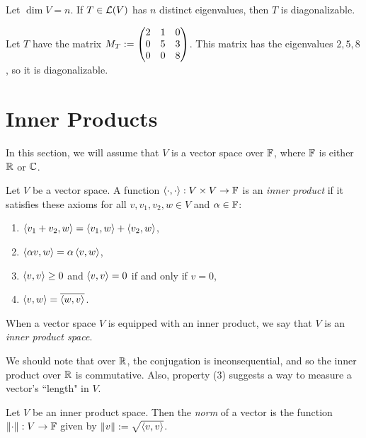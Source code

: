 \documentclass{article}
\begin{document}
\begin{corollary}
Let $\dim V = n$. If $T\in\mathcal L(V)$ has $n$ distinct eigenvalues, then $T$ is diagonalizable.
\end{corollary}
\begin{example}
Let $T$ have the matrix $M_T :=\begin{pmatrix}2 & 1 & 0 \\ 0 & 5 & 3 \\ 0 & 0 & 8 \end{pmatrix}$. This matrix has the eigenvalues $2, 5, 8$, so it is diagonalizable.
\end{example}
\section{Inner Products}
In this section, we will assume that $V$ is a vector space over $\mathbb F$, where $\mathbb F$ is either $\mathbb R$ or $\mathbb C$.
\begin{definition}
Let $V$ be a vector space. A function $\left\langle\cdot, \cdot\right\rangle: V\times V\to \mathbb F$ is an \textit{inner product} if it satisfies these axioms for all $v, v_1, v_2, w\in V$ and $\alpha\in\mathbb F$:
\begin{enumerate}
    \item $\left\langle v_1+v_2, w\right\rangle = \left\langle v_1, w\right\rangle + \left\langle v_2, w\right\rangle$,
    \item $\left\langle\alpha v, w\right\rangle = \alpha\left\langle v, w\right\rangle$,
    \item $\left\langle v, v\right\rangle\geq 0$ and $\left\langle v,v\right\rangle = 0$ if and only if $v=0$,
    \item $\left\langle v, w\right\rangle = \overline{\left\langle w, v\right\rangle}$.
\end{enumerate}
When a vector space $V$ is equipped with an inner product, we say that $V$ is an \textit{inner product space}.
\end{definition}
\newpage

We should note that over $\mathbb R$, the conjugation is inconsequential, and so the inner product over $\mathbb R$ is commutative. Also, property (3) suggests a way to measure a vector's ``length" in $V$.

\begin{definition}
Let $V$ be an inner product space. Then the \textit{norm} of a vector is the function $\left\Vert \cdot\right\Vert: V\to \mathbb F$ given by $\left\Vert v\right\Vert := \sqrt{\left\langle v, v\right\rangle}$.
\end{definition}
\end{document}
